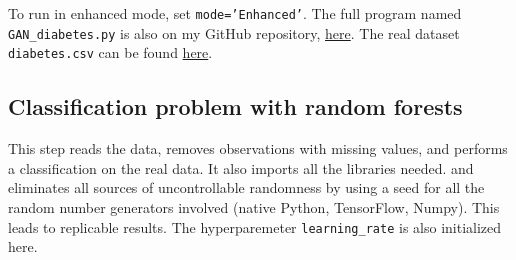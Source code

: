 \documentclass[oneside,10pt]{book}
\begin{document}
To run in enhanced mode, set \texttt{mode='Enhanced'}. The full program named \texttt{GAN\_diabetes.py} 
 is also on my GitHub repository, 
 \href{https://github.com/VincentGranville/Main/blob/main/GAN_diabetes.py}{here}. The real dataset
 \texttt{diabetes.csv} can be found \href{https://github.com/VincentGranville/Main/blob/main/diabetes.csv}{here}.


\subsection{Classification problem with random forests}\label{cfpadgfvew}

This step reads the data, removes observations with missing values, and performs a classification on the real data. It also imports all the libraries needed.
 and eliminates all sources of uncontrollable randomness by using a seed for all the random number generators involved (native Python,
 TensorFlow, Numpy). This leads to replicable results. The hyperparemeter \texttt{learning\_rate} is also initialized here.\vspace{1ex}
\end{document}
